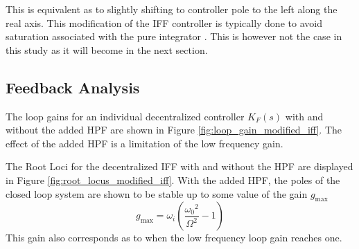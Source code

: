\documentclass{ISMA_USD2020}
\begin{document}
This is equivalent as to slightly shifting to controller pole to the left along the real axis.
This modification of the IFF controller is typically done to avoid saturation associated with the pure integrator \cite{preumont91_activ}.
This is however not the case in this study as it will become in the next section.

\subsection{Feedback Analysis}
\label{sec:org6529021}
The loop gains for an individual decentralized controller \(K_F(s)\) with and without the added HPF are shown in Figure \ref{fig:loop_gain_modified_iff}.
The effect of the added HPF is a limitation of the low frequency gain.

The Root Loci for the decentralized IFF with and without the HPF are displayed in Figure \ref{fig:root_locus_modified_iff}.
With the added HPF, the poles of the closed loop system are shown to be stable up to some value of the gain \(g_\text{max}\)
\begin{equation}
\label{eq:gmax_iff_hpf}
  g_{\text{max}} = \omega_i \left( \frac{{\omega_0}^2}{\Omega^2} - 1 \right)
\end{equation}
This gain also corresponds as to when the low frequency loop gain reaches one.
\end{document}
